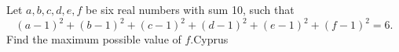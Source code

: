 Let $a,b,c,d,e,f$ be six real numbers with sum 10, such that \[ (a-1)^2+(b-1)^2+(c-1)^2+(d-1)^2+(e-1)^2+(f-1)^2 = 6. \] Find the maximum possible value of $f$.Cyprus